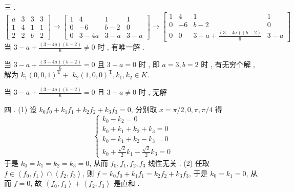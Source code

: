 \documentclass[10pt]{article}
\begin{document}
 三 .
$$
\left[\begin{array}{llll}
a & 3 & 3 & 3 \\
1 & 4 & 1 & 1 \\
2 & 2 & b & 2
\end{array}\right] \rightarrow\left[\begin{array}{ccccc}
1 & 4 & 1 & 1 \\
0 & -6 & b-2 & 0 \\
0 & 3-4 a & 3-a & 3-a
\end{array}\right] \rightarrow\left[\begin{array}{cccc}
1 & 4 & 1 & 1 \\
0 & -6 & b-2 & 0 \\
0 & 0 & 3-a+\frac{(3-4 a)(b-2)}{6} & 3-a
\end{array}\right]
$$
 当  $3-a+\frac{(3-4 a)(b-2)}{6} \neq 0$  时 ,  有唯一解 .

 当  $3-a+\frac{(3-4 a)(b-2)}{6}=0$  且  $3-a=0$  时 ,  即  $a=3, b=2$  时 ,  有无穷个解 ,  解为  $k_{1}(0,0,1)^{\mathrm{T}}+$ $k_{2}(1,0,0)^{\mathrm{T}}, k_{1}, k_{2} \in K .$

 当  $3-a+\frac{(3-4 a)(b-2)}{6}=0$  且  $3-a \neq 0$  时 ,  无解 

 四 . (1)  设  $k_{0} f_{0}+k_{1} f_{1}+k_{2} f_{2}+k_{3} f_{3}=0$,  分别取  $x=\pi / 2,0, \pi, \pi / 4$  得 
$$
\left\{\begin{array}{r}
k_{0}-k_{2}=0 \\
k_{0}+k_{1}+k_{2}+k_{3}=0 \\
k_{0}-k_{1}+k_{2}-k_{3}=0 \\
k_{0}+\frac{\sqrt{2}}{2} k_{1}-\frac{\sqrt{2}}{2} k_{3}=0
\end{array}\right.
$$
 于是  $k_{0}=k_{1}=k_{2}=k_{3}=0$,  从而  $f_{0}, f_{1}, f_{2}, f_{3}$  线性无关 . (2)  任取  $f \in\left\langle f_{0}, f_{1}\right\rangle \cap\left\langle f_{2}, f_{3}\right\rangle$,  则  $f=k_{0} f_{0}+k_{1} f_{1}=k_{2} f_{2}+k_{3} f_{3}$,  于是  $k_{0}=k_{1}=0$,  从而  $f=0$,  故  $\left\langle f_{0}, f_{1}\right\rangle+\left\langle f_{2}, f_{3}\right\rangle$  是直和 .
\end{document}
